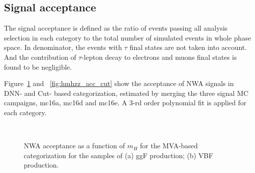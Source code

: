 \subsection{Signal acceptance} 
\label{sec:hmhzz_signal_acc}
The signal acceptance is defined as the ratio of events passing all analysis selection in each category to the total number of simulated events in whole phase space.
In denominator, the events with $\tau$ final states are not taken into account.
And the contribution of $\tau$-lepton decay to electrons and muons final states is found to be negligible.

Figure~\ref{fig:hmhzz_acc_dnn} and ~\ref{fig:hmhzz_acc_cut} show the acceptance of NWA signals in DNN- and Cut- based categorization, estimated by merging the three signal MC campaigns, mc16a, mc16d and mc16e.
A 3-rd order polynomial fit is applied for each category.

\begin{figure}[h]
\centering
{}
\\
\caption{NWA acceptance as a function of $m_{H}$ for the MVA-based categorization for the samples of
(a) ggF production;
(b) VBF production. 
}
\label{fig:hmhzz_acc_dnn}
\end{figure}

